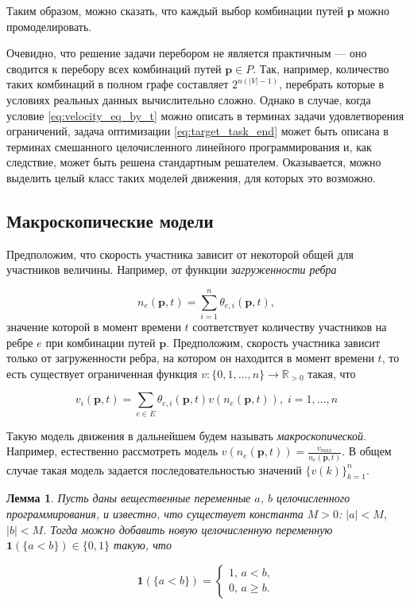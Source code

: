 \documentclass[12pt, a4paper]{article}
\newtheorem{lemma}{Лемма}[section]
\begin{document}
Таким образом, можно сказать, что каждый выбор комбинации путей $\textbf{p}$ можно промоделировать.

Очевидно, что решение задачи перебором не является практичным --- оно сводится к перебору всех комбинаций путей $\textbf{p} \in P$. Так, например, количество таких комбинаций в полном графе составляет $2^{n (|V| - 1)}$, перебрать которые в условиях реальных данных вычислительно сложно.
Однако в случае, когда условие \eqref{eq:velocity_eq_by_t} можно описать в терминах задачи удовлетворения ограничений, задача оптимизации \eqref{eq:target_task_end} может быть описана в терминах смешанного целочисленного линейного программирования и, как следствие, может быть решена стандартным решателем. Оказывается, можно выделить целый класс таких моделей движения, для которых это возможно.

\subsection{Макроскопические модели}

Предположим, что скорость участника зависит от некоторой общей для участников величины. Например, от функции \textit{загруженности ребра}

$$ n_{e}(\textbf{p}, t) = \sum\limits_{i = 1}^n\theta_{e, i}(\textbf{p}, t),$$
значение которой в момент времени $t$ соответствует количеству участников на ребре $e$ при комбинации путей $\textbf{p}$. Предположим, скорость участника зависит только от загруженности ребра, на котором он находится в момент времени $t$, то есть существует ограниченная функция $v : \{0, 1, \dots, n\} \rightarrow \mathbb{R}_{> 0}$ такая, что

\begin{equation}
	\label{eq:velocity_eq_macro}
	 v_i(\textbf{p}, t) = \sum \limits _{e \in E} \theta_{e, i} (\textbf{p}, t) v (n_e (\textbf{p}, t)), \; i = 1, \dots, n
\end{equation}

Такую модель движения в дальнейшем будем называть \textit{макроскопической}.
Например, естественно рассмотреть модель $ v (n_e (\textbf{p}, t)) = \frac{v_{max}}{n_e (\textbf{p}, t)}$. В общем случае такая модель задается последовательностью значений  $\{v(k)\}_{k = 1}^n$.

\begin{lemma}
	\label{lemma:lt}
	Пусть даны вещественные переменные $a$, $b$ целочисленного программирования, и известно, что существует константа $M > 0$: $|a| < M$, $|b| < M$. Тогда можно добавить новую целочисленную переменную $\textbf{1} (\{a < b\}) \in \{0, 1\}$ такую, что
	
	\begin{equation*}
		\textbf{1} (\{a < b\}) = 
		\begin{cases}
			1,\, a < b,
			\\
			0,\, a \ge b.
		\end{cases}
	\end{equation*}

\end{lemma}
\end{document}

